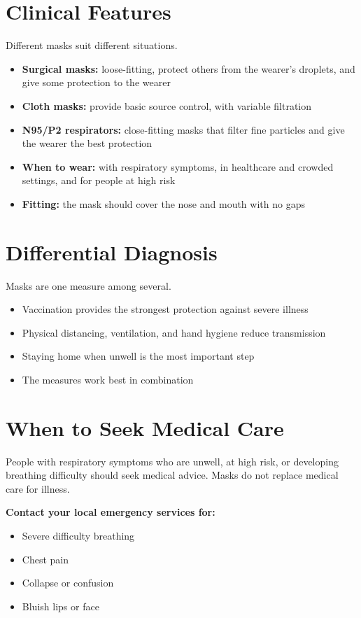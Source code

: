 \section*{Clinical Features}
Different masks suit different situations.
\begin{itemize}
    \item \textbf{Surgical masks:} loose-fitting, protect others from the wearer's droplets, and give some protection to the wearer
    \item \textbf{Cloth masks:} provide basic source control, with variable filtration
    \item \textbf{N95/P2 respirators:} close-fitting masks that filter fine particles and give the wearer the best protection
    \item \textbf{When to wear:} with respiratory symptoms, in healthcare and crowded settings, and for people at high risk
    \item \textbf{Fitting:} the mask should cover the nose and mouth with no gaps
\end{itemize}

\section*{Differential Diagnosis}
Masks are one measure among several.
\begin{itemize}
    \item Vaccination provides the strongest protection against severe illness
    \item Physical distancing, ventilation, and hand hygiene reduce transmission
    \item Staying home when unwell is the most important step
    \item The measures work best in combination
\end{itemize}

\section*{When to Seek Medical Care}
People with respiratory symptoms who are unwell, at high risk, or developing breathing difficulty should seek medical advice. Masks do not replace medical care for illness.

\textbf{Contact your local emergency services for:}
\begin{itemize}
    \item Severe difficulty breathing
    \item Chest pain
    \item Collapse or confusion
    \item Bluish lips or face
\end{itemize}

